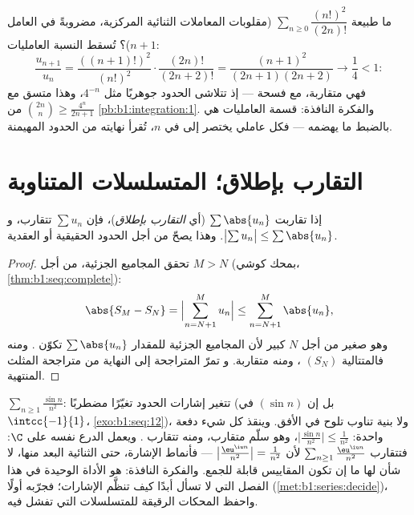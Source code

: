 \begin{example}\label{ex:b1:series:ratiobinom}
ما طبيعة $\sum_{n\geq0} \dfrac{(n!)^2}{(2n)!}$ (مقلوبات
المعاملات الثنائية المركزية، مضروبةً في العامل $n + 1$)؟
تُسقط النسبة العامليات:
\[
\frac{u_{n+1}}{u_n}
= \frac{((n+1)!)^2}{(n!)^2}\cdot\frac{(2n)!}{(2n+2)!}
= \frac{(n+1)^2}{(2n+1)(2n+2)}
\longrightarrow \frac14 < 1 :
\]
فهي متقاربة، مع فسحة --- إذ تتلاشى الحدود جوهريًا
مثل $4^{-n}$، وهذا متسق مع $\binom{2n}{n} \geq
\frac{4^n}{2n+1}$ من \cref{pb:b1:integration:1}. والفكرة
النافذة: قسمة العامليات هي بالضبط ما يهضمه 
--- فكل عاملي يختصر إلى  في
$n$، تُقرأ نهايته من الحدود المهيمنة.
\end{example}

\section{التقارب بإطلاق؛ المتسلسلات المتناوبة}

\begin{theorem}\label{thm:b1:series:absolute}
إذا تقاربت $\sum \abs{u_n}$ (أي \emph{التقارب
بإطلاق})، فإن $\sum u_n$ تتقارب،
و $\bigl|\sum u_n\bigr| \leq \sum \abs{u_n}$. وهذا يصحّ من أجل الحدود الحقيقية
أو العقدية.
\end{theorem}

\begin{proof}
تحقق المجاميع الجزئية، من أجل $M > N$ (بمحك كوشي،
\cref{thm:b1:seq:complete}):
\[
\abs{S_M - S_N} = \Bigl| \sum_{n=N+1}^{M} u_n \Bigr|
\leq \sum_{n=N+1}^{M} \abs{u_n},
\]
وهو صغير من أجل $N$ كبير لأن المجاميع الجزئية للمقدار $\sum\abs{u_n}$
تكوّن . ومنه فالمتتالية $(S_N)$ ، ومنه متقاربة. و
تمرّ المتراجحة إلى النهاية من متراجحة المثلث المنتهية.
\end{proof}

\begin{example}\label{ex:b1:series:absexamples}
$\sum_{n\geq1} \frac{\sin n}{n^2}$: تتغير إشارات الحدود
تغيّرًا مضطربًا (بل إن $(\sin n)$  في $\intcc{-1}{1}$،
\cref{exo:b1:seq:12})، ولا بنية تناوب تلوح
في الأفق. وينقذ  كل شيء دفعة واحدة:
$\bigl|\frac{\sin n}{n^2}\bigr| \leq \frac{1}{n^2}$، وهو
سلّم متقارب، ومنه تتقارب . ويعمل الدرع نفسه
على $\C$: فتتقارب $\sum_{n\geq1}\frac{\eu^{\iu n}}{n^2}$
لأن $\bigl|\frac{\eu^{\iu n}}{n^2}\bigr| = \frac{1}{n^2}$
--- فأنماط الإشارة، حتى الثنائية البعد منها، لا شأن لها
ما إن تكون المقاييس قابلة للجمع. والفكرة النافذة:  هو الأداة الوحيدة في هذا الفصل التي لا تسأل أبدًا كيف
تنظَّم الإشارات؛ فجرّبه أولًا
(\cref{met:b1:series:decide})، واحفظ المحكات الرقيقة
للمتسلسلات التي تفشل فيه.
\end{example}

